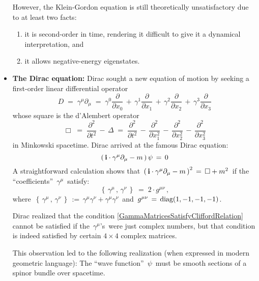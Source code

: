\begin{itemize}
	However, the Klein-Gordon equation is still theoretically unsatisfactory due to at least two facts:
	\begin{enumerate}
	\item
		it is second-order in time, rendering it difficult to give it a dynamical interpretation, and
	\item
		it allows negative-energy eigenstates.
	\end{enumerate}
\item
	\textbf{The Dirac equation:}
	\vskip 0.01cm
	Dirac sought a new equation of motion by seeking a first-order linear differential operator
	\begin{equation*}
	D
	\;=\;
		\gamma^{\mu}\partial_{\mu}
	\;=\;
		\gamma^{0}\dfrac{\partial}{\partial x_{0}} 
		\,+\, \gamma^{1}\dfrac{\partial}{\partial x_{1}} 
		\,+\, \gamma^{2}\dfrac{\partial}{\partial x_{2}} 
		\,+\, \gamma^{3}\dfrac{\partial}{\partial x_{3}} 
	\end{equation*}
	whose square is the d'Alembert operator
	\begin{equation*}
	\Box
	\;=\;
		\dfrac{\partial^{2}}{\partial t^{2}} \,-\, \Delta
	\;=\;
		\dfrac{\partial^{2}}{\partial t^{2}}
		\,-\, \dfrac{\partial^{2}}{\partial x_{1}^{2}}
		\,-\, \dfrac{\partial^{2}}{\partial x_{2}^{2}}
		\,-\, \dfrac{\partial^{2}}{\partial x_{3}^{2}}
	\end{equation*}
	in Minkowski spacetime. 
	Dirac arrived at the famous Dirac equation:
	\begin{equation*}
	\left(\,\textnormal{\bf i}\cdot\gamma^{\mu}\partial_{\mu} - m\,\right)\psi \, = \, 0
	\end{equation*}
	A straightforward calculation shows that
	\,$\left(\,\textnormal{\bf i}\cdot\gamma^{\mu}\partial_{\mu} - m\,\right)^{2} \,=\, \Box + m^{2}$\,
	if the ``coefficients'' \,$\gamma^{\mu}$\, satisfy:
	\begin{equation}
	\label{GammaMatricesSatisfyCliffordRelation}
	\left\{\,\gamma^{\mu}\,,\,\gamma^{\nu}\,\right\}
	\;=\;
		2\cdot g^{\mu\nu}\,,
	\end{equation}
	where
	\,$\left\{\,\gamma^{\mu}\,,\,\gamma^{\nu}\,\right\} \,:=\, \gamma^{\mu}\gamma^{\nu} + \gamma^{\mu}\gamma^{\nu}$\,
	and
	\,$g^{\mu\nu} \,=\, \textnormal{diag}(1,-1,-1,-1)$.\,

	Dirac realized that the condition \eqref{GammaMatricesSatisfyCliffordRelation} cannot be satisfied
	if the \,$\gamma^{\mu}$'s\, were just complex numbers, but that condition is indeed satisfied by
	certain $4 \times 4$ complex matrices.

	This observation led to the following realization (when expressed in modern geometric language):
	The ``wave function'' \,$\psi$\, must be smooth sections of a spinor bundle over spacetime.


\end{itemize}
